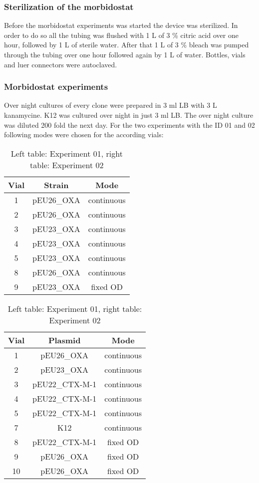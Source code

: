 \subsubsection{Sterilization of the morbidostat}
Before the morbidostat experiments was started the device was sterilized. In order to do so all the tubing was flushed with 1 L of 3 \% citric acid over one hour, followed by 1 L of sterile water. After that 1 L of 3 \% bleach was pumped through the tubing over one hour followed again by 1 L of water. Bottles, vials and luer connectors were autoclaved.
\label{section:sterilization}

\subsubsection{Morbidostat experiments}
Over night cultures of every clone were prepared in 3 ml LB with 3 \textmu L kanamycine. K12 was cultured over night in just 3 ml LB. The over night culture was diluted 200 fold the next day. For the two experiments with the ID 01 and 02 following modes were chosen for the according vials:
\begin{table}[H]
	\begin{tabular}{|c c c|}	
		\hline
		Vial & Strain & Mode \\
		\hline
		1 & pEU26\_OXA & continuous \\
		\hline
		2 & pEU26\_OXA & continuous \\
		\hline
		3 & pEU23\_OXA & continuous \\
		\hline
		4 & pEU23\_OXA & continuous \\
		\hline
		5 & pEU23\_OXA & continuous \\
		\hline
		8 & pEU26\_OXA & continuous \\
		\hline
		9 & pEU23\_OXA & fixed OD \\
		\hline
	\end{tabular}
	\quad
	\begin{tabular}{|c c c|}	
		\hline
		Vial & Plasmid & Mode \\
		\hline
		1 & pEU26\_OXA & continuous \\
		\hline
		2 & pEU23\_OXA & continuous \\
		\hline
		3 & pEU22\_CTX-M-1 & continuous \\
		\hline
		4 & pEU22\_CTX-M-1 & continuous \\
		\hline
		5 & pEU22\_CTX-M-1 & continuous \\
		\hline
		7 & K12 & continuous \\
		\hline
		8 & pEU22\_CTX-M-1 & fixed OD \\
		\hline
		9 & pEU26\_OXA & fixed OD \\
		\hline
		10 & pEU26\_OXA & fixed OD \\
		\hline
	\end{tabular}
	\caption{Left table: Experiment 01, right table: Experiment 02}
	\label{table:vial_modes}
\end{table}

